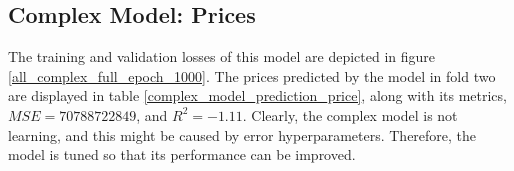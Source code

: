 \documentclass[12pt,twoside]{report}
\begin{document}
\subsection{Complex Model: Prices}
\label{complex_price}
The training and validation losses of this model are depicted in figure \ref{all_complex_full_epoch_1000}. The prices predicted by the model in fold two are displayed in table \ref{complex_model_prediction_price}, along with its metrics, $MSE = 70788722849$, and $R^2 = -1.11$. Clearly, the complex model is not learning, and this might be caused by error hyperparameters. Therefore, the model is tuned so that its performance can be improved. 
\\
\begin{figure}[!htbp]
	\centering
	\hfill
	\hfill
	\hfil

\end{figure}
\end{document}
